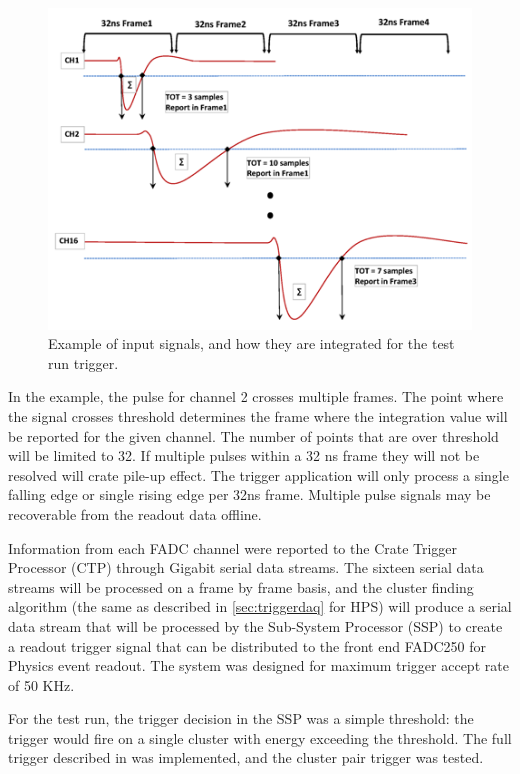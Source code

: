 \begin{figure}[t]
\includegraphics[scale=0.9]{test2012/trigger//trigger_pulse_samples}
\caption{\small{Example of input signals, and how they are integrated for the test run trigger.}}\label{fig:trigsamples}
\end{figure}

In the example, the pulse for channel 2 crosses multiple frames.  The point where the signal crosses threshold determines the frame where the integration value will be reported for the given channel.  The number of points that are over threshold will be limited to 32. If multiple pulses within a 32 ns frame they will not be resolved will crate pile-up effect.  The trigger application will only process a single falling edge or single rising edge per 32ns frame.  Multiple pulse signals may be recoverable from the readout data offline.

Information from each FADC channel were reported to the Crate Trigger Processor (CTP) through Gigabit serial data streams. The sixteen serial data streams will be processed on a frame by frame basis, and the cluster finding algorithm (the same as described in \ref{sec:triggerdaq} for HPS) will produce a serial data stream that will be processed by the Sub-System Processor (SSP) to create a readout trigger signal that can be distributed to the front end FADC250 for Physics event readout. The system was designed for maximum trigger accept rate of 50 KHz. 

For the test run, the trigger decision in the SSP was a simple threshold: the trigger would fire on a single cluster with energy exceeding the threshold. The full trigger described in \cite{HPS_tPROP} was implemented, and the cluster pair trigger was tested.
